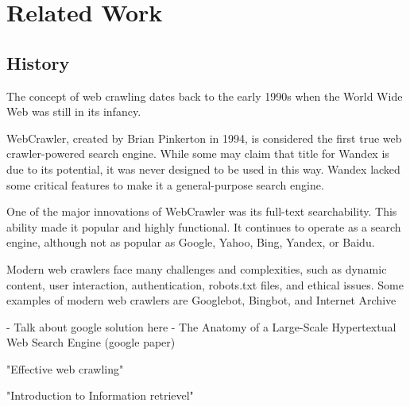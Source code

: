 \chapter{Related Work}
\label{chap:relatedwork}
\section{History}
The concept of web crawling dates back to the early 1990s when the World Wide Web was still in its infancy.

WebCrawler, created by Brian Pinkerton in 1994, is considered the first true web crawler-powered search engine. While some may claim that title for Wandex is due to its potential, it was never designed to be used in this way. Wandex lacked some critical features to make it a general-purpose search engine.

One of the major innovations of WebCrawler was its full-text searchability. This ability made it popular and highly functional. It continues to operate as a search engine, although not as popular as Google, Yahoo, Bing, Yandex, or Baidu.

Modern web crawlers face many challenges and complexities, such as dynamic content, user interaction, authentication, robots.txt files, and ethical issues. Some examples of modern web crawlers are Googlebot, Bingbot, and Internet Archive

- Talk about google solution here
- 
The Anatomy of a Large-Scale Hypertextual Web Search Engine (google paper) 

"Effective web crawling"

"Introduction to Information retrievel"
